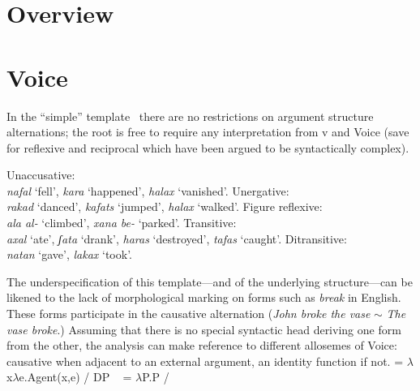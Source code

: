 \label{chap:voice}
\section{Overview}



\section{Voice}

In the ``simple'' template \tkal~there are no restrictions on argument structure alternations; the root is free to require any interpretation from v and Voice (save for reflexive and reciprocal which have been argued to be syntactically complex).\\
    \begin{minipage}[t]{0.5\textwidth}
    \pex
        \a Unaccusative:\\ \emph{nafal} `fell', \emph{kara} `happened', \emph{halax} `vanished'.
        \a Unergative:\\ \emph{rakad} `danced', \emph{kafats} `jumped', \emph{halax} `walked'.
        \a Figure reflexive:\\ \emph{ala al-} `climbed', \emph{xana be-} `parked'.
        \a Transitive:\\ \emph{axal} `ate', \emph{ʃata} `drank', \emph{haras} `destroyed', \emph{tafas} `caught'.
        \a Ditransitive:\\ \emph{natan} `gave', \emph{lakax} `took'.
    \xe
\end{minipage}
\begin{minipage}[t]{0.05\textwidth}
    \phantom{asdfasdf}
\end{minipage}
\begin{minipage}[t]{0.4\textwidth}
    \ex
    \xe
\end{minipage}

The underspecification of this template---and of the underlying structure---can be likened to the lack of morphological marking on forms such as \emph{break} in English. These forms participate in the causative alternation (\emph{John broke the vase} $\sim$ \emph{The vase broke}.) Assuming that there is no special syntactic head deriving one form from the other, the analysis can make reference to different allosemes of Voice: causative when adjacent to an external argument, an identity function if not.
\pex
	\a {} = $\lambda$x$\lambda$e.Agent(x,e) / DP \trace~
	\a {} = $\lambda$P.P / \trace~
\xe

